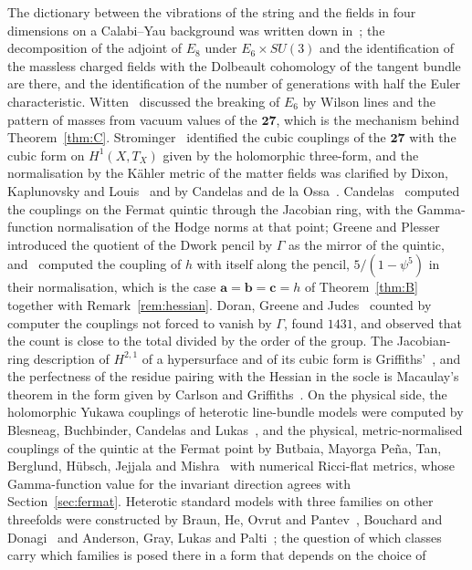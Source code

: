 \documentclass[11pt]{amsart}
\theoremstyle{definition}
\theoremstyle{remark}
\newcommand{\bb}{\mathbf{b}}
\newcommand{\cc}{\mathbf{c}}
\newcommand{\va}{\mathbf{a}}
\begin{document}
The dictionary between the vibrations of the string and the fields in four
dimensions on a Calabi--Yau background was written down in~\cite{CHSW85};
the
decomposition of the adjoint of $E_8$ under $E_6\times SU(3)$ and the
identification of the massless charged fields with the Dolbeault cohomology
of the tangent bundle are there, and the identification of the number of
generations with half the Euler characteristic. Witten~\cite{Wit85}
discussed the breaking of $E_6$ by Wilson lines and the pattern of masses
from vacuum values of the $\mathbf{27}$, which is the mechanism behind
Theorem~\ref{thm:C}. Strominger~\cite{Str85} identified the cubic couplings
of the $\mathbf{27}$ with the cubic form on $H^1(X,T_X)$ given by the
holomorphic three-form, and the normalisation by the K\"ahler metric of the
matter fields was clarified by Dixon, Kaplunovsky and Louis~\cite{DKL90}
and by Candelas and de la Ossa~\cite{CdlO91}. Candelas~\cite{Can88}
computed the couplings on the Fermat quintic through the Jacobian ring, with
the Gamma-function normalisation of the Hodge norms at that point; Greene
and Plesser~\cite{GP90} introduced the quotient of the Dwork pencil by
$\Gamma$ as the mirror of the quintic, and~\cite{CDGP91} computed the
coupling of $h$ with itself along the pencil, $5/(1-\psi^5)$ in their
normalisation, which is the case $\va=\bb=\cc=h$ of Theorem~\ref{thm:B}
together with Remark~\ref{rem:hessian}. Doran, Greene and
Judes~\cite{DGJ08} counted by computer the couplings not forced to vanish
by $\Gamma$, found $1431$, and observed that the count is close to the
total divided by the order of the group. The Jacobian-ring description of $H^{2,1}$ of a hypersurface and
of its cubic form is Griffiths'~\cite{Gri69}, and the perfectness of the
residue pairing with the Hessian in the socle is Macaulay's theorem in the
form given by Carlson and Griffiths~\cite{CG80}. On the physical side, the
holomorphic Yukawa couplings of heterotic line-bundle models were computed
by Blesneag, Buchbinder, Candelas and Lukas~\cite{BBCL16}, and the physical,
metric-normalised couplings of the quintic at the Fermat point by Butbaia,
Mayorga Pe\~na, Tan, Berglund, H\"ubsch, Jejjala and Mishra~\cite{BMT24} with
numerical Ricci-flat metrics, whose Gamma-function value for the invariant
direction agrees with Section~\ref{sec:fermat}. Heterotic standard models
with three families on other threefolds were constructed by Braun, He, Ovrut
and Pantev~\cite{BHOP05}, Bouchard and Donagi~\cite{BD06} and Anderson,
Gray, Lukas and Palti~\cite{AGLP11,AGLP12}; the question of which classes
carry which families is posed there in a form that depends on the choice of
\end{document}
